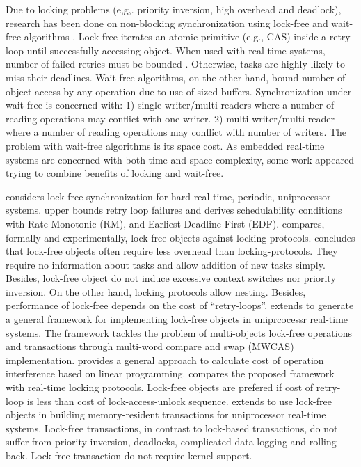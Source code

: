 Due to locking problems (e,g,. priority inversion, high overhead and
deadlock), research has been done on non-blocking synchronization
using lock-free \cite{anderson96framework,563704,anderson1997lock,holman2006supporting,Lai:2009:SSR:1529282.1529660,1656921,726426,4297311,5669659}
and wait-free algorithms \cite{726426,1508449,Cho:2006:UAP:1141277.1141490,4297311,1003807,hohmuth2001pragmatic,1613351,811240,896371,896423,1203552,5953690}.
Lock-free iterates an atomic primitive (e.g., CAS) inside a retry
loop until successfully accessing object. When used with real-time
systems, number of failed retries must be bounded \cite{anderson96framework,563704}.
Otherwise, tasks are highly likely to miss their deadlines. Wait-free
algorithms, on the other hand, bound number of object access by any
operation due to use of sized buffers. Synchronization under wait-free
is concerned with: 1) single-writer/multi-readers where a number of
reading operations may conflict with one writer. 2) multi-writer/multi-reader
where a number of reading operations may conflict with number of writers.
The problem with wait-free algorithms is its space cost. As embedded
real-time systems are concerned with both time and space complexity,
some work appeared trying to combine benefits of locking and wait-free.

\cite{anderson96framework} considers lock-free synchronization for
hard-real time, periodic, uniprocessor systems. \cite{anderson96framework}
upper bounds retry loop failures and derives schedulability conditions
with Rate Monotonic (RM), and Earliest Deadline First (EDF). \cite{anderson96framework}
compares, formally and experimentally, lock-free objects against locking
protocols. \cite{anderson96framework} concludes that lock-free objects
often require less overhead than locking-protocols. They require no
information about tasks and allow addition of new tasks simply. Besides,
lock-free object do not induce excessive context switches nor priority
inversion. On the other hand, locking protocols allow nesting. Besides,
performance of lock-free depends on the cost of {}``retry-loops''.
\cite{563704} extends \cite{anderson96framework} to generate a general
framework for implementing lock-free objects in uniprcocessr real-time
systems. The framework tackles the problem of multi-objects lock-free
operations and transactions through multi-word compare and swap (MWCAS)
implementation. \cite{563704} provides a general approach to calculate
cost of operation interference based on linear programming. \cite{563704}
compares the proposed framework with real-time locking protocols.
Lock-free objects are prefered if cost of retry-loop is less than
cost of lock-access-unlock sequence. \cite{anderson1997lock} extends
\cite{anderson96framework,563704} to use lock-free objects in building
memory-resident transactions for uniprocessor real-time systems. Lock-free
transactions, in contrast to lock-based transactions, do not suffer
from priority inversion, deadlocks, complicated data-logging and rolling
back. Lock-free transaction do not require kernel support.

